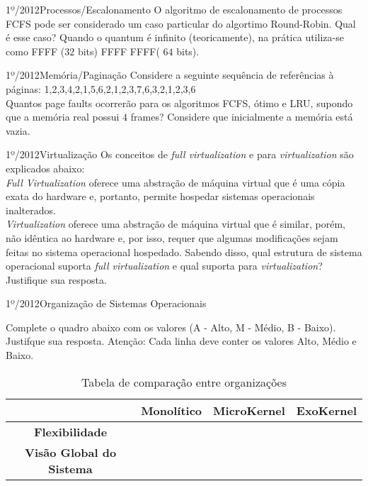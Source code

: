 \begin{exercicio}
  {1º/2012}{Processos/Escalonamento}
  {O algoritmo de escalonamento de processos FCFS pode ser considerado um caso particular do algortimo Round-Robin. Qual é esse caso?}
  Quando o quantum é infinito (teoricamente), na prática utiliza-se como FFFF ($32$ bits) FFFF FFFF( $64$ bits).
\end{exercicio}

\begin{exercicio}
  {1º/2012}{Memória/Paginação}
  {Considere a seguinte sequência de referências à páginas:
  1,2,3,4,2,1,5,6,2,1,2,3,7,6,3,2,1,2,3,6 \\
  Quantos page faults ocorrerão para os algoritmos FCFS, ótimo e LRU, supondo que a memória real possui $4$ frames? Considere que inicialmente a memória está vazia.}
\end{exercicio}

\begin{exercicio}
  {1º/2012}{Virtualização}
  {Os conceitos de \textit{full virtualization} e para \textit{virtualization} são explicados abaixo:\\
  \textit{Full Virtualization} oferece uma abstração de máquina virtual que é uma cópia exata do hardware e, portanto, permite hospedar sistemas operacionais inalterados.\\
  \textit{Virtualization} oferece uma abstração de máquina virtual que é similar, porém, não idêntica ao hardware e, por isso, requer que algumas modificações sejam feitas no sistema operacional hospedado.
  Sabendo disso, qual estrutura de sistema operacional suporta \textit{full virtualization} e qual suporta para \textit{virtualization}? Justifique sua resposta.}
\end{exercicio}

\begin{exercicio}
  {1º/2012}{Organização de Sistemas Operacionais}
  {Complete o quadro abaixo com os valores (A - Alto, M - Médio, B - Baixo). Justifque sua resposta. Atenção: Cada linha deve conter os valores Alto, Médio e Baixo.
  \begin{table}[!h]
    \centering
    \caption{Tabela de comparação entre organizações}
    \label{tab:ex15}
    \begin{tabular}{clll}
      \hline \hline
    \multicolumn{1}{l}{}             & \multicolumn{1}{c}{\textbf{Monolítico}} & \multicolumn{1}{c}{\textbf{MicroKernel}} & \multicolumn{1}{c}{\textbf{ExoKernel}} \\ \hline
    \textbf{Flexibilidade}           &                                         &                                          &                                        \\
    \textbf{Visão Global do Sistema} &                                         &                                          &                                        \\ \hline \hline
    \end{tabular}
    \end{table}}
\end{exercicio}





